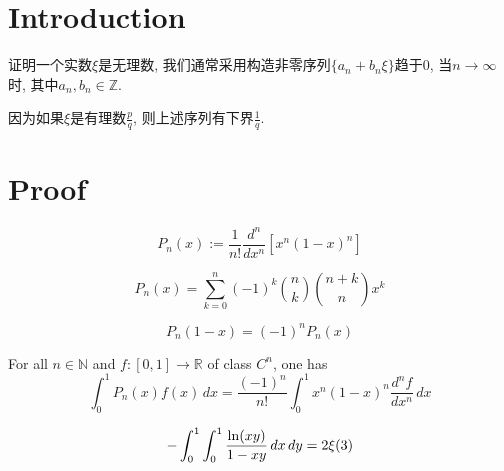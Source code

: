 %

\chapter{Introduction}

证明一个实数$\xi$是无理数, 我们通常采用构造非零序列$\{a_n + b_n\xi\}$趋于$0$, 当$n \rightarrow \infty$时, 其中$a_n, b_n \in \mathbb{Z}$.

因为如果$\xi$是有理数$\frac{p}{q}$, 则上述序列有下界$\frac{1}{q}$.

\chapter{Proof}

\begin{definition}\label{Legendre_poly}
    \[ P_n(x):=\frac{1}{n!}\frac{d^n}{dx^n}[x^n(1-x)^n] \]
\end{definition}

\begin{lemma}\label{Legendre_poly_is_int}
    \[ P_n(x)=\sum\limits_{k=0}^{n}(-1)^k\binom{n}{k}\binom{n+k}{n}x^k \]
\end{lemma}

\begin{lemma}\label{Legendre_poly_sym}
    \[ P_n(1-x)=(-1)^nP_n(x) \]
\end{lemma}

\begin{lemma}\label{Legendre_poly_integral}
    For all $n \in \mathbb{N}$ and $f : [0,1] \rightarrow \mathbb{R}$ of class $C^n$, one has
    \[ \int_{0}^{1}P_n(x)f(x) \, dx =\frac{(-1)^n}{n!} \int_{0}^{1} x^n(1-x)^n\frac{d^nf}{dx^n} \, dx \]
\end{lemma}

\begin{lemma}\label{integral_zeta_3}
    \[ -\int_{0}^{1}\int_{0}^{1} \frac{{\rm ln}(xy)}{1-xy} \, dx \, dy = 2\xi(3) \]
\end{lemma}

